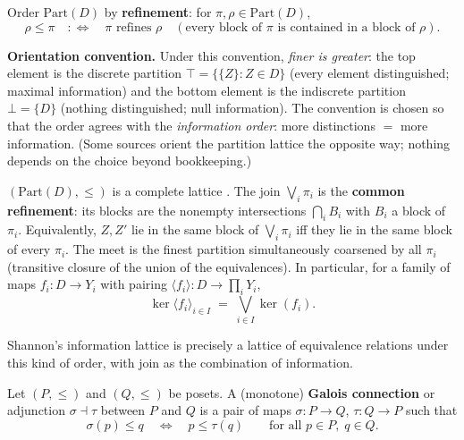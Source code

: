 
Order \(\mathrm{Part}(D)\) by \textbf{refinement}: for \(\pi, \rho \in \mathrm{Part}(D)\),
\[
\rho \le \pi \quad :\iff \quad \pi \text{ refines } \rho \quad (\text{every block of } \pi \text{ is contained in a block of } \rho).
\]

\textbf{Orientation convention.} Under this convention, \emph{finer is greater}: the top element is the discrete partition \(\top = \{\{Z\} : Z \in D\}\) (every element distinguished; maximal information) and the bottom element is the indiscrete partition \(\bot = \{D\}\) (nothing distinguished; null information). The convention is chosen so that the order agrees with the \emph{information order}: more distinctions \(=\) more information. (Some sources orient the partition lattice the opposite way; nothing depends on the choice beyond bookkeeping.)

\begin{thmplain}

\((\mathrm{Part}(D), \le)\) is a complete lattice \autocite{ore1942,birkhoff1967}. The join \(\bigvee_i \pi_i\) is the \textbf{common refinement}: its blocks are the nonempty intersections \(\bigcap_i B_i\) with \(B_i\) a block of \(\pi_i\). Equivalently, \(Z, Z'\) lie in the same block of \(\bigvee_i \pi_i\) iff they lie in the same block of every \(\pi_i\). The meet is the finest partition simultaneously coarsened by all \(\pi_i\) (transitive closure of the union of the equivalences). In particular, for a family of maps \(f_i : D \to Y_i\) with pairing \(\langle f_i \rangle : D \to \prod_i Y_i\),
\[
\ker \langle f_i \rangle_{i \in I} \;=\; \bigvee_{i \in I} \ker(f_i).
\tag{3.1}
\]
\end{thmplain}

Shannon's information lattice \autocite{shannon1953} is precisely a lattice of equivalence relations under this kind of order, with join as the combination of information.


Let \((P, \le)\) and \((Q, \le)\) be posets. A (monotone) \textbf{Galois connection} or adjunction \(\sigma \dashv \tau\) between \(P\) and \(Q\) is a pair of maps \(\sigma : P \to Q\), \(\tau : Q \to P\) such that
\[
\sigma(p) \le q \quad \iff \quad p \le \tau(q) \qquad \text{for all } p \in P,\; q \in Q.
\]


